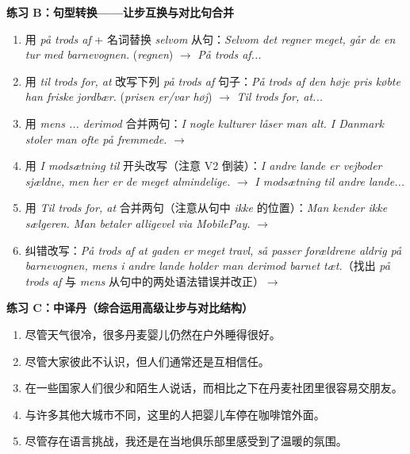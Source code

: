 \textbf{练习 B：句型转换——让步互换与对比句合并}
\begin{enumerate}
  \item 用 \textit{på trods af} + 名词替换 \textit{selvom} 从句：\textit{Selvom det regner meget, går de en tur med barnevognen.} (\textit{regnen}) $\rightarrow$ \textit{På trods af...}
  \item 用 \textit{til trods for, at} 改写下列 \textit{på trods af} 句子：\textit{På trods af den høje pris købte han friske jordbær.} (\textit{prisen er/var høj}) $\rightarrow$ \textit{Til trods for, at...}
  \item 用 \textit{mens ... derimod} 合并两句：\textit{I nogle kulturer låser man alt. I Danmark stoler man ofte på fremmede.} $\rightarrow$
  \item 用 \textit{I modsætning til} 开头改写（注意 V2 倒装）：\textit{I andre lande er vejboder sjældne, men her er de meget almindelige.} $\rightarrow$ \textit{I modsætning til andre lande...}
  \item 用 \textit{Til trods for, at} 合并两句（注意从句中 \textit{ikke} 的位置）：\textit{Man kender ikke sælgeren. Man betaler alligevel via MobilePay.} $\rightarrow$
  \item 纠错改写：\textit{På trods af at gaden er meget travl, så passer forældrene aldrig på barnevognen, mens i andre lande holder man derimod barnet tæt.}（找出 \textit{på trods af} 与 \textit{mens} 从句中的两处语法错误并改正）$\rightarrow$
\end{enumerate}

\textbf{练习 C：中译丹（综合运用高级让步与对比结构）}
\begin{enumerate}
  \item 尽管天气很冷，很多丹麦婴儿仍然在户外睡得很好。
  \item 尽管大家彼此不认识，但人们通常还是互相信任。
  \item 在一些国家人们很少和陌生人说话，而相比之下在丹麦社团里很容易交朋友。
  \item 与许多其他大城市不同，这里的人把婴儿车停在咖啡馆外面。
  \item 尽管存在语言挑战，我还是在当地俱乐部里感受到了温暖的氛围。
\end{enumerate}



